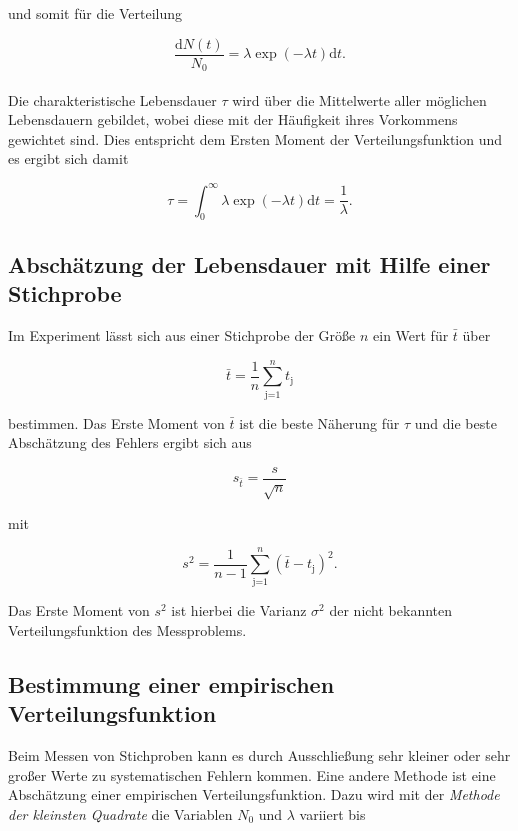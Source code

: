 und somit für die Verteilung

\begin{equation}
	\frac{\text{d}N(t)}{N_\text{0}} = \lambda \exp{(-\lambda t)} \text{d}t .
\end{equation}
\\
Die charakteristische Lebensdauer $\tau$ wird über die Mittelwerte aller möglichen Lebensdauern gebildet, wobei diese mit der Häufigkeit ihres Vorkommens gewichtet sind.
Dies entspricht dem Ersten Moment der Verteilungsfunktion und es ergibt sich damit

\begin{equation}
	\tau = \int_\text{0}^\infty \lambda \exp{(-\lambda t)} \text{d}t = \frac{1}{\lambda} .
\end{equation}
\FloatBarrier
\subsection{Abschätzung der Lebensdauer mit Hilfe einer Stichprobe} %
\label{sub:abschaetzung_der_lebensdauer_mit_hilfe_einer_stichprobe}

Im Experiment lässt sich aus einer Stichprobe der Größe $n$ ein Wert für $\bar{t}$ über

\begin{equation}
	\bar{t} = \frac{1}{n} \sum_{\text{j=1}}^n t_\text{j}
\end{equation}

bestimmen.
Das Erste Moment von $\bar{t}$ ist die beste Näherung für $\tau$ und die beste Abschätzung des Fehlers ergibt sich aus

\begin{equation}
	s_{\bar{t}} = \frac{s}{\sqrt{n}}
\end{equation}

mit

\begin{equation}
	s^2 = \frac{1}{n-1} \sum_\text{j=1}^n \left(\bar{t} - t_\text{j}\right)^2 .
\end{equation}


Das Erste Moment von $s^2$ ist hierbei die Varianz $\sigma^2$ der nicht bekannten Verteilungsfunktion des Messproblems.
\FloatBarrier
\subsection{Bestimmung einer empirischen Verteilungsfunktion} %
\label{sub:bestimmung_einer_empirischen_verteilungsfunktion}


Beim Messen von Stichproben kann es durch Ausschließung sehr kleiner oder sehr großer Werte zu systematischen Fehlern kommen.
Eine andere Methode ist eine Abschätzung einer empirischen Verteilungsfunktion.
Dazu wird mit der \textit{Methode der kleinsten Quadrate} die Variablen $N_\text{0}$ und $\lambda$ variiert bis

